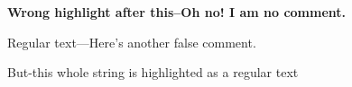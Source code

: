 

\begin{center}
    \textbf{\Large{Wrong highlight after this--Oh no! I am no comment.}}
\end{center}

Regular text---Here's another false comment.

But-this whole string is highlighted as a regular text


